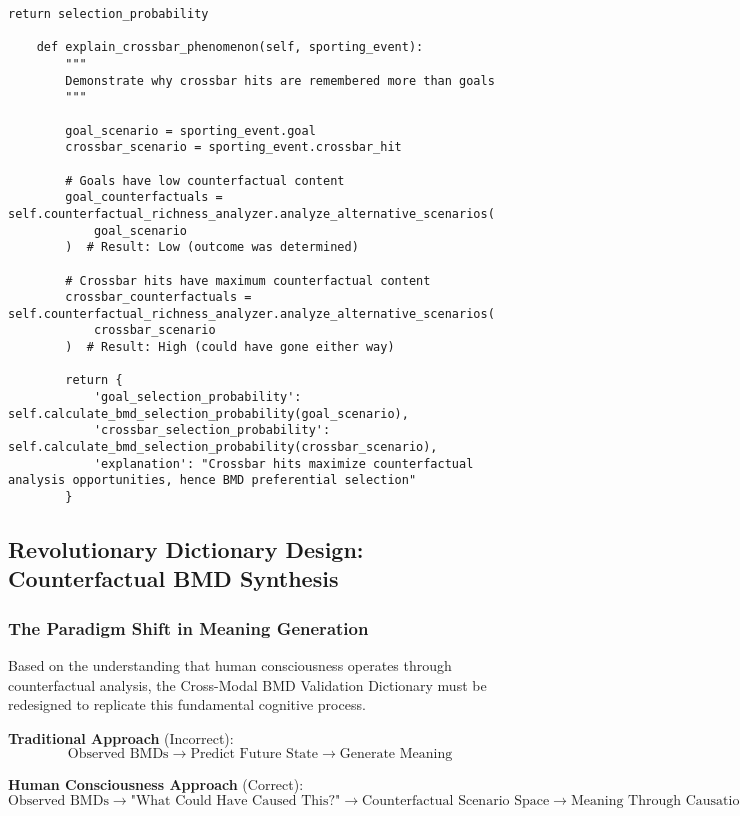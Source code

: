 \documentclass[12pt,a4paper]{article}
\begin{document}
\begin{lstlisting}[style=pythonstyle, caption=BMD Counterfactual Selection Engine]
        return selection_probability
        
    def explain_crossbar_phenomenon(self, sporting_event):
        """
        Demonstrate why crossbar hits are remembered more than goals
        """
        
        goal_scenario = sporting_event.goal
        crossbar_scenario = sporting_event.crossbar_hit
        
        # Goals have low counterfactual content
        goal_counterfactuals = self.counterfactual_richness_analyzer.analyze_alternative_scenarios(
            goal_scenario
        )  # Result: Low (outcome was determined)
        
        # Crossbar hits have maximum counterfactual content
        crossbar_counterfactuals = self.counterfactual_richness_analyzer.analyze_alternative_scenarios(
            crossbar_scenario
        )  # Result: High (could have gone either way)
        
        return {
            'goal_selection_probability': self.calculate_bmd_selection_probability(goal_scenario),
            'crossbar_selection_probability': self.calculate_bmd_selection_probability(crossbar_scenario),
            'explanation': "Crossbar hits maximize counterfactual analysis opportunities, hence BMD preferential selection"
        }
\end{lstlisting}

\subsection{Revolutionary Dictionary Design: Counterfactual BMD Synthesis}

\subsubsection{The Paradigm Shift in Meaning Generation}

Based on the understanding that human consciousness operates through counterfactual analysis, the Cross-Modal BMD Validation Dictionary must be redesigned to replicate this fundamental cognitive process.

\textbf{Traditional Approach} (Incorrect):
$$\text{Observed BMDs} \rightarrow \text{Predict Future State} \rightarrow \text{Generate Meaning}$$

\textbf{Human Consciousness Approach} (Correct):
$$\text{Observed BMDs} \rightarrow \text{"What Could Have Caused This?"} \rightarrow \text{Counterfactual Scenario Space} \rightarrow \text{Meaning Through Causation Understanding}$$
\end{document}
